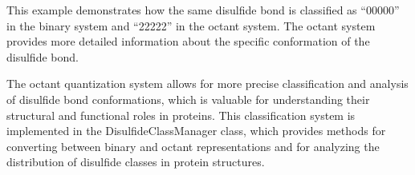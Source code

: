 This example demonstrates how the same disulfide bond is classified as ``00000'' in the binary system and ``22222'' in the octant system. The octant system provides more detailed information about the specific conformation of the disulfide bond.

The octant quantization system allows for more precise classification and analysis of disulfide bond conformations, which is valuable for understanding their structural and functional roles in proteins. This classification system is implemented in the DisulfideClassManager class, which provides methods for converting between binary and octant representations and for analyzing the distribution of disulfide classes in protein structures.
